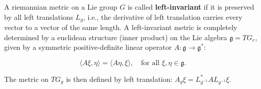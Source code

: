 A riemannian metric on a Lie group $G$ is called \textbf{left-invariant} if it is preserved by all left translations $L_g$, i.e., the derivative of left translation carries every vector to a vector of the same length. A left-invariant metric is completely determined by a euclidean structure (inner product) on the Lie algebra $\mathfrak{g} = TG_e$, given by a symmetric positive-definite linear operator $A: \mathfrak{g} \to \mathfrak{g}^*$:

$$\langle A\xi, \eta \rangle = \langle A\eta, \xi \rangle, \quad \text{for all } \xi, \eta \in \mathfrak{g}.$$

The metric on $TG_g$ is then defined by left translation: $A_g \xi = L_{g^{-1}}^* A L_{g^{-1}} \xi$.
